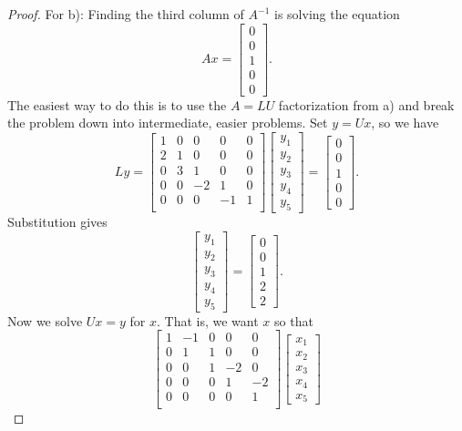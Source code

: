 \documentclass{article}
\theoremstyle{definition}
\begin{document}
\begin{proof}
For b): Finding the third column of $A^{-1}$ is solving the equation 
\[Ax=\begin{bmatrix}
	0\\0\\1\\0\\0
\end{bmatrix}.\]
The easiest way to do this is to use the $A=LU$ factorization from a) and break the problem down into intermediate, easier problems. Set $y=Ux$, so we have 
\[Ly=\begin{bmatrix}
	1 & 0& 0&0&0\\
	2&1&0&0&0\\
	0&3&1&0&0\\
	0&0&-2&1&0\\
	0&0&0&-1&1\\
\end{bmatrix}\begin{bmatrix}
y_1\\y_2\\y_3\\y_4\\y_5
\end{bmatrix}= \begin{bmatrix}
0\\0\\1\\0\\0
\end{bmatrix}.\] Substitution gives 
\[\begin{bmatrix}
	y_1\\y_2\\y_3\\y_4\\y_5
\end{bmatrix}= \begin{bmatrix}
	0\\0\\1\\ 2\\2
\end{bmatrix}.\]
Now we solve $Ux=y$ for $x$. That is, we want $x$ so that
\[\begin{bmatrix}1 & -1& 0&0&0\\
0&1&1&0&0\\
0&0&1&-2&0\\
0&0&0&1&-2\\
0&0&0&0&1\\
\end{bmatrix}\begin{bmatrix}
x_1\\x_2\\x_3\\x_4\\x_5

\end{bmatrix}\]
\end{proof}
\end{document}

